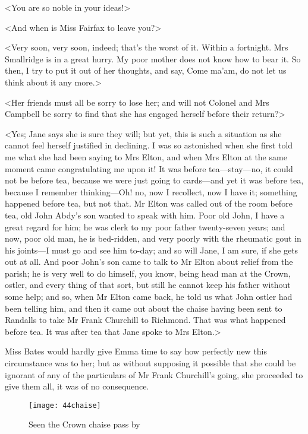 <You are so noble in your ideas!>

<And when is Miss Fairfax to leave you?>

<Very soon, very soon, indeed; that's the worst of it. Within a fortnight. Mrs Smallridge is in a great hurry. My poor mother does not know how to bear it. So then, I try to put it out of her thoughts, and say, Come ma'am, do not let us think about it any more.>

<Her friends must all be sorry to lose her; and will not Colonel and Mrs Campbell be sorry to find that she has engaged herself before their return?>

<Yes; Jane says she is sure they will; but yet, this is such a situation as she cannot feel herself justified in declining. I was so astonished when she first told me what she had been saying to Mrs Elton, and when Mrs Elton at the same moment came congratulating me upon it! It was before tea—stay—no, it could not be before tea, because we were just going to cards—and yet it was before tea, because I remember thinking—Oh! no, now I recollect, now I have it; something happened before tea, but not that. Mr Elton was called out of the room before tea, old John Abdy's son wanted to speak with him. Poor old John, I have a great regard for him; he was clerk to my poor father twenty-seven years; and now, poor old man, he is bed-ridden, and very poorly with the rheumatic gout in his joints—I must go and see him to-day; and so will Jane, I am sure, if she gets out at all. And poor John's son came to talk to Mr Elton about relief from the parish; he is very well to do himself, you know, being head man at the Crown, ostler, and every thing of that sort, but still he cannot keep his father without some help; and so, when Mr Elton came back, he told us what John ostler had been telling him, and then it came out about the chaise having been sent to Randalls to take Mr Frank Churchill to Richmond. That was what happened before tea. It was after tea that Jane spoke to Mrs Elton.>

Miss Bates would hardly give Emma time to say how perfectly new this circumstance was to her; but as without supposing it possible that she could be ignorant of any of the particulars of Mr Frank Churchill's going, she proceeded to give them all, it was of no consequence.

\begin{figure}[tbph]
\centering
\texttt{[image: 44chaise]}
\caption{Seen the Crown chaise pass by}
\end{figure}


